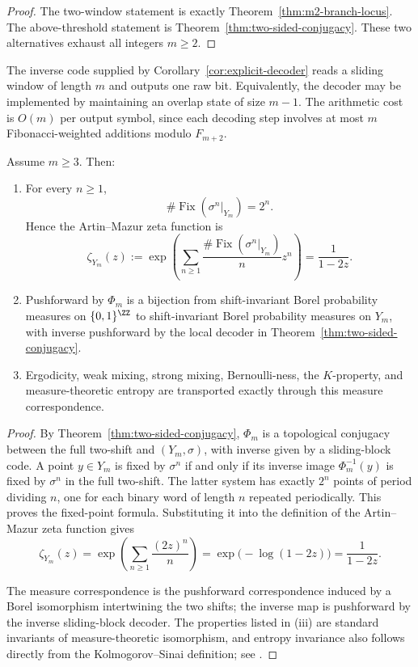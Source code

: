 \begin{proof}
The two-window statement is exactly Theorem~\ref{thm:m2-branch-locus}.  The
above-threshold statement is Theorem~\ref{thm:two-sided-conjugacy}.  These two
alternatives exhaust all integers $m\ge2$.
\end{proof}

\begin{remark}\label{rem:decoder-complexity}
The inverse code supplied by Corollary~\ref{cor:explicit-decoder} reads a
sliding window of length $m$ and outputs one raw bit. Equivalently, the decoder
may be implemented by maintaining an overlap state of size $m-1$. The
arithmetic cost is $O(m)$ per output symbol, since each decoding step involves
at most $m$ Fibonacci-weighted additions modulo $F_{m+2}$.
\end{remark}

\begin{proposition}\label{prop:conjugacy-consequences}
Assume $m\ge3$.  Then:
\begin{enumerate}[label=(\roman*),leftmargin=*,itemsep=2pt]
  \item For every $n\ge1$,
  \[
  \#\operatorname{Fix}(\sigma^n|_{Y_m})=2^n.
  \]
  Hence the Artin--Mazur zeta function is
  \[
  \zeta_{Y_m}(z)
  :=\exp\left(\sum_{n\ge1}
  \frac{\#\operatorname{Fix}(\sigma^n|_{Y_m})}{n}z^n\right)
  =
  \frac{1}{1-2z}.
  \]
  \item Pushforward by $\Phi_m$ is a bijection from shift-invariant Borel
  probability measures on $\{0,1\}^{\ZZ}$ to shift-invariant Borel
  probability measures on $Y_m$, with inverse pushforward by the local
  decoder in Theorem~\ref{thm:two-sided-conjugacy}.
  \item Ergodicity, weak mixing, strong mixing, Bernoulli-ness, the
  $K$-property, and measure-theoretic entropy are transported exactly through
  this measure correspondence.
\end{enumerate}
\end{proposition}

\begin{proof}
By Theorem~\ref{thm:two-sided-conjugacy}, $\Phi_m$ is a topological conjugacy
between the full two-shift and $(Y_m,\sigma)$, with inverse given by a
sliding-block code.  A point $y\in Y_m$ is fixed by $\sigma^n$ if and only if
its inverse image $\Phi_m^{-1}(y)$ is fixed by $\sigma^n$ in the full
two-shift.  The latter system has exactly $2^n$ points of period dividing
$n$, one for each binary word of length $n$ repeated periodically.  This
proves the fixed-point formula.  Substituting it into the definition of the
Artin--Mazur zeta function gives
\[
\zeta_{Y_m}(z)=
\exp\left(\sum_{n\ge1}\frac{(2z)^n}{n}\right)
=\exp\bigl(-\log(1-2z)\bigr)
=\frac{1}{1-2z}.
\]

The measure correspondence is the pushforward correspondence induced by a
Borel isomorphism intertwining the two shifts; the inverse map is pushforward
by the inverse sliding-block decoder.  The properties listed in (iii) are
standard invariants of measure-theoretic isomorphism, and entropy invariance
also follows directly from the Kolmogorov--Sinai definition; see
\cite{Walters1982}.
\end{proof}

